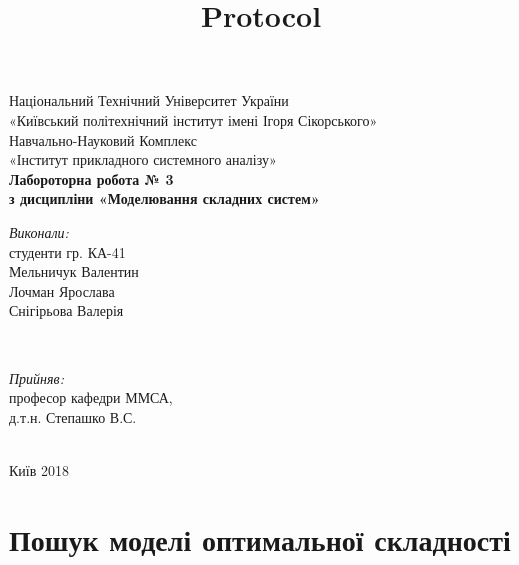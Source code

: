 \documentclass[11pt]{article}
\title{Protocol}
\begin{document}
    
    
    \begin{titlepage} 

\center

{\large
Національний Технічний Університет України\\[0.2cm]
«Київський політехнічний інститут імені Ігоря Сікорського»\\[0.2cm]
Навчально-Науковий Комплекс \\[0.2cm]
«Інститут прикладного системного аналізу»
}\\[4cm] %


{ \LARGE \bfseries
Лабороторна робота № 3 \\[0.4cm]
з дисципліни «Моделювання складних систем»
}\\[5cm] %

\begin{minipage}{0.4\textwidth}
\begin{flushleft} \large
\emph{Виконали:} \\
студенти гр. КА-41 \\
Мельничук Валентин \\
Лочман Ярослава  \\
Снігірьова Валерія
\end{flushleft}
\end{minipage}
~
\begin{minipage}{0.4\textwidth}
\begin{flushright} \large
\emph{Прийняв:} \\
професор кафедри ММСА, \\
д.т.н. Степашко В.С. \\
\end{flushright}
\end{minipage}\\[6cm]

Київ 2018

\vfill %

\end{titlepage}

    

    \section{Пошук моделі оптимальної
складності}\label{ux43fux43eux448ux443ux43a-ux43cux43eux434ux435ux43bux456-ux43eux43fux442ux438ux43cux430ux43bux44cux43dux43eux457-ux441ux43aux43bux430ux434ux43dux43eux441ux442ux456}
\end{document}
